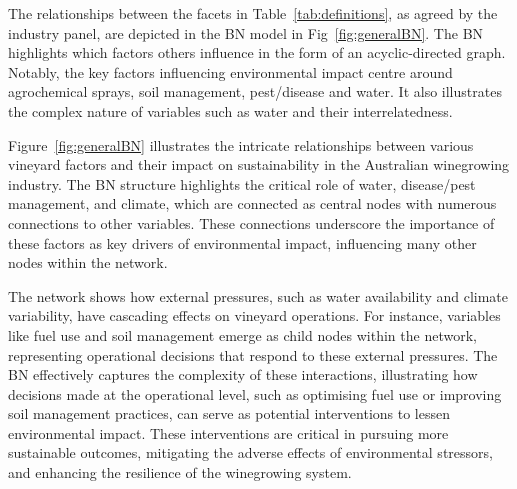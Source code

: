 \documentclass[10pt,letterpaper]{article}
\begin{document}
The relationships between the facets in Table~\ref{tab:definitions}, as agreed by the industry panel, are depicted in the BN model in Fig~\ref{fig:generalBN}. The BN highlights which factors others influence in the form of an acyclic-directed graph. Notably, the key factors influencing environmental impact centre around agrochemical sprays, soil management, pest/disease and water. It also illustrates the complex nature of variables such as water and their interrelatedness.


% 



Figure~\ref{fig:generalBN} illustrates the intricate relationships between various vineyard factors and their impact on sustainability in the Australian winegrowing industry. The BN structure highlights the critical role of water, disease/pest management, and climate, which are connected as central nodes with numerous connections to other variables. These connections underscore the importance of these factors as key drivers of environmental impact, influencing many other nodes within the network.

The network shows how external pressures, such as water availability and climate variability, have cascading effects on vineyard operations. For instance, variables like fuel use and soil management emerge as child nodes within the network, representing operational decisions that respond to these external pressures. The BN effectively captures the complexity of these interactions, illustrating how decisions made at the operational level, such as optimising fuel use or improving soil management practices, can serve as potential interventions to lessen environmental impact. These interventions are critical in pursuing more sustainable outcomes, mitigating the adverse effects of environmental stressors, and enhancing the resilience of the winegrowing system.
\end{document}
